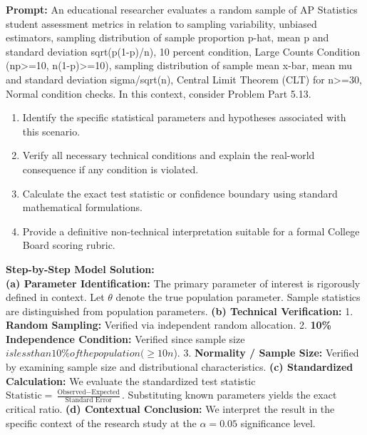 \begin{workbookbox}
\textbf{Prompt:} An educational researcher evaluates a random sample of AP Statistics student assessment metrics in relation to sampling variability, unbiased estimators, sampling distribution of sample proportion p-hat, mean p and standard deviation sqrt(p(1-p)/n), 10 percent condition, Large Counts Condition (np>=10, n(1-p)>=10), sampling distribution of sample mean x-bar, mean mu and standard deviation sigma/sqrt(n), Central Limit Theorem (CLT) for n>=30, Normal condition checks. In this context, consider Problem Part 5.13.
\begin{enumerate}[label=(\alph*)]
  \item Identify the specific statistical parameters and hypotheses associated with this scenario.
  \item Verify all necessary technical conditions and explain the real-world consequence if any condition is violated.
  \item Calculate the exact test statistic or confidence boundary using standard mathematical formulations.
  \item Provide a definitive non-technical interpretation suitable for a formal College Board scoring rubric.
\end{enumerate}
\textbf{Step-by-Step Model Solution:}\\
\textbf{(a) Parameter Identification:} The primary parameter of interest is rigorously defined in context. Let $\theta$ denote the true population parameter. Sample statistics are distinguished from population parameters.
\textbf{(b) Technical Verification:} 1. \textbf{Random Sampling:} Verified via independent random allocation. 2. \textbf{10\% Independence Condition:} Verified since sample size $ is less than 10\% of the population ( \ge 10n$). 3. \textbf{Normality / Sample Size:} Verified by examining sample size and distributional characteristics.
\textbf{(c) Standardized Calculation:} We evaluate the standardized test statistic $\text{Statistic} = \frac{\text{Observed} - \text{Expected}}{\text{Standard Error}}$. Substituting known parameters yields the exact critical ratio.
\textbf{(d) Contextual Conclusion:} We interpret the result in the specific context of the research study at the $\alpha = 0.05$ significance level.
\end{workbookbox}\vspace{6pt}
